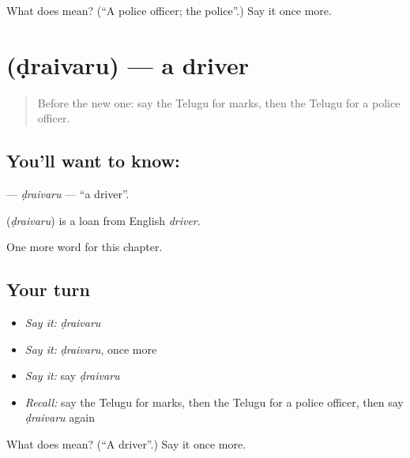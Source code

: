 \begin{tcolorbox}[breakable,colback=teal!4,colframe=teal!35!black,title={Before you move on}]
What does  mean? (\textquotedblleft{}A police officer; the police\textquotedblright{}.) Say it once more.
\end{tcolorbox}
\section[\texorpdfstring{\te{డ్రైవరు} (ḍraivaru)}{డ్రైవరు (ḍraivaru)}]{ (ḍraivaru) — a driver}

\label{lesson:TE-C237-draivaru}



\begin{quote}
Before the new one: say the Telugu for marks, then the Telugu for a police officer.
\end{quote}

\subsection*{You'll want to know: }
\textbf{} — \emph{ḍraivaru} — \textquotedblleft{}a driver\textquotedblright{}.

\begin{cousinweb}
\textbf{} (\emph{ḍraivaru}) is a loan from English \emph{driver}.
\end{cousinweb}

\begin{grammarlens}[title={What you've built}]
One more word for this chapter.
\end{grammarlens}

\subsection*{Your turn}
\begin{itemize}
\raggedright
  \item \emph{Say it:} \emph{ḍraivaru}
  \item \emph{Say it:} \emph{ḍraivaru}, once more
  \item \emph{Say it:} say \emph{ḍraivaru}
  \item \emph{Recall:} say the Telugu for marks, then the Telugu for a police officer, then say \emph{ḍraivaru} again
\end{itemize}

\begin{tcolorbox}[breakable,colback=teal!4,colframe=teal!35!black,title={Before you move on}]
What does  mean? (\textquotedblleft{}A driver\textquotedblright{}.) Say it once more.
\end{tcolorbox}
